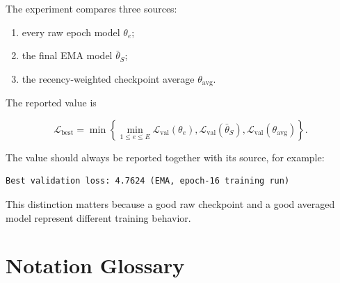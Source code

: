 \documentclass[11pt,a4paper]{article}
\begin{document}
The experiment compares three sources:

\begin{enumerate}
  \item every raw epoch model $\theta_e$;
  \item the final EMA model $\bar\theta_S$;
  \item the recency-weighted checkpoint average $\theta_{\mathrm{avg}}$.
\end{enumerate}

The reported value is

\begin{equation}
  \mathcal{L}_{\mathrm{best}}
  =\min\left\{
    \min_{1\le e\le E}\mathcal{L}_{\mathrm{val}}(\theta_e),
    \mathcal{L}_{\mathrm{val}}(\bar\theta_S),
    \mathcal{L}_{\mathrm{val}}(\theta_{\mathrm{avg}})
  \right\}.
\end{equation}

The value should always be reported together with its source, for example:

\begin{lstlisting}
Best validation loss: 4.7624 (EMA, epoch-16 training run)
\end{lstlisting}

This distinction matters because a good raw checkpoint and a good averaged model
represent different training behavior.

\section{Notation Glossary}
\end{document}

